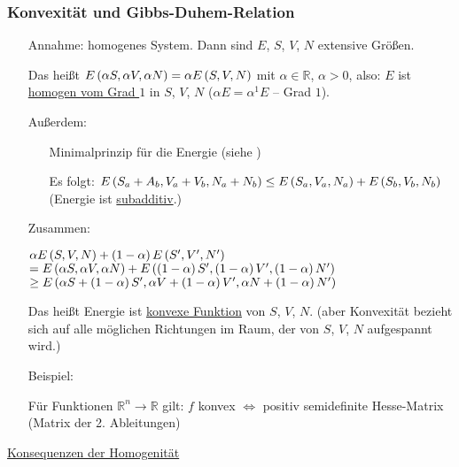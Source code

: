 \subsubsection{Konvexität und Gibbs-Duhem-Relation}
\begin{itemize}[align=left]
  \item[Annahme:] homogenes System. Dann sind $E$, $S$, $V$, $N$ extensive Größen.
  \item[Das heißt] $E\left( \alpha S, \alpha V, \alpha N \right) = \alpha E \left( S,V,N \right)$ mit $\alpha \in \mathds{R}$, $\alpha > 0$, also: $E$ ist \uline{homogen vom Grad $1$} in $S$, $V$, $N$ ($\alpha E = \alpha^1 E$ -- Grad $1$).
  \item[Außerdem:] \begin{itemize}[align=left]
    \item[Minimalprinzip] für die Energie (siehe \pageref{minEnergie})
    \item[Es folgt:]$E\left( S_a+A_b,V_a+V_b,N_a+N_b \right) \leq E\left( S_a,V_a,N_a \right) + E\left( S_b,V_b,N_b \right)$ (Energie ist \uline{subadditiv}.)
  \end{itemize}
  \item[Zusammen:]
  \item[$\alpha E \left( S,V,N \right) + \left( 1-\alpha \right) E\left( S',V',N' \right)$]  $= E\left( \alpha S, \alpha V, \alpha N \right) + E \left( \left( 1-\alpha \right)S',\left( 1-\alpha \right)V',\left( 1-\alpha \right)N' \right)$\\$ \geq E\left( \alpha S + \left( 1-\alpha \right)S', \alpha V + \left( 1-\alpha \right)V', \alpha N + \left( 1-\alpha \right) N' \right)$
  \item[Das heißt] Energie ist \uline{konvexe Funktion} von $S$, $V$, $N$. (aber Konvexität bezieht sich auf alle möglichen Richtungen im Raum, der von $S$, $V$, $N$ aufgespannt wird.)
  \item[Beispiel:] 
  \item[Für Funktionen $\mathds{R}^n \to \mathds{R}$ gilt:] $f$ konvex $\Leftrightarrow$ positiv semidefinite Hesse-Matrix (Matrix der 2. Ableitungen)
\end{itemize}
\uline{Konsequenzen der Homogenität}
